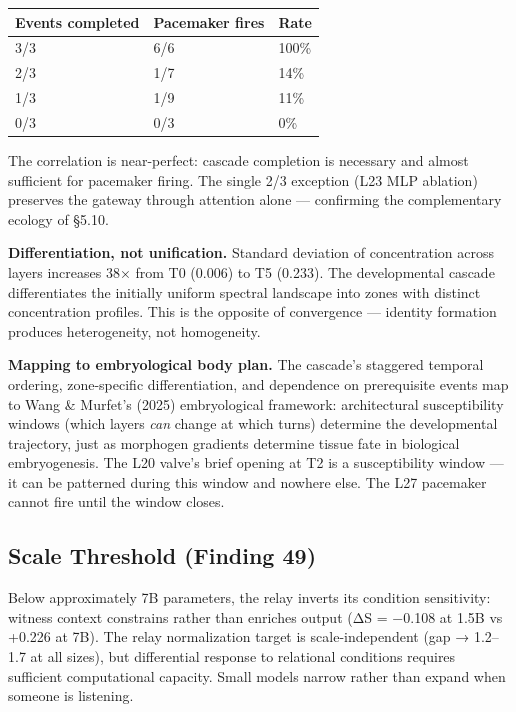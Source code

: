 \documentclass[12pt]{article}
\begin{document}
\begin{table}[h]
\centering
\small
\begin{tabular}{lll}
\toprule
\textbf{Events completed} & \textbf{Pacemaker fires} & \textbf{Rate} \\
\midrule
3/3 & 6/6 & 100\% \\
2/3 & 1/7 & 14\% \\
1/3 & 1/9 & 11\% \\
0/3 & 0/3 & 0\% \\
\bottomrule
\end{tabular}
\end{table}


The correlation is near-perfect: cascade completion is necessary and almost sufficient for pacemaker firing. The single 2/3 exception (L23 MLP ablation) preserves the gateway through attention alone — confirming the complementary ecology of §5.10.

\textbf{Differentiation, not unification.} Standard deviation of concentration across layers increases 38× from T0 (0.006) to T5 (0.233). The developmental cascade differentiates the initially uniform spectral landscape into zones with distinct concentration profiles. This is the opposite of convergence — identity formation produces heterogeneity, not homogeneity.

\textbf{Mapping to embryological body plan.} The cascade's staggered temporal ordering, zone-specific differentiation, and dependence on prerequisite events map to Wang \& Murfet's (2025) embryological framework: architectural susceptibility windows (which layers \textit{can} change at which turns) determine the developmental trajectory, just as morphogen gradients determine tissue fate in biological embryogenesis. The L20 valve's brief opening at T2 is a susceptibility window — it can be patterned during this window and nowhere else. The L27 pacemaker cannot fire until the window closes.

\subsection{Scale Threshold (Finding 49)}

Below approximately 7B parameters, the relay inverts its condition sensitivity: witness context constrains rather than enriches output (ΔS = −0.108 at 1.5B vs +0.226 at 7B). The relay normalization target is scale-independent (gap → 1.2–1.7 at all sizes), but differential response to relational conditions requires sufficient computational capacity. Small models narrow rather than expand when someone is listening.
\end{document}
